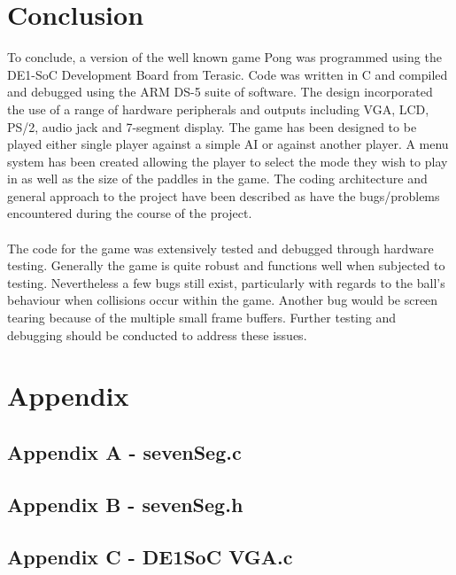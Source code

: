 \documentclass[a4paper,12pt]{article}
\begin{document}
\section{Conclusion}
\begin{flushleft}
To conclude, a version of the well known game Pong was programmed using the DE1-SoC Development Board from Terasic. Code was written in C and compiled and debugged using the ARM DS-5 suite of software. The design incorporated the use of a range of hardware peripherals and outputs including VGA, LCD, PS/2, audio jack and 7-segment display. The game has been designed to be played either single player against a simple AI or against another player. A menu system has been created allowing the player to select the mode they wish to play in as well as the size of the paddles in the game. The coding architecture and general approach to the project have been described as have the bugs/problems encountered during the course of the project. 
\\ \- \\
The code for the game was extensively tested and debugged through hardware testing. Generally the game is quite robust and functions well when subjected to testing. Nevertheless a few bugs still exist, particularly with regards to the ball’s behaviour when collisions occur within the game. Another bug would be screen tearing because of the multiple small frame buffers. Further testing and debugging should be conducted to address these issues. 
\end{flushleft}
\newpage
\section{Appendix \label{section:appendix}}
\subsection{Appendix A - sevenSeg.c}

\newpage
\subsection{Appendix B - sevenSeg.h}

\newpage
\subsection{Appendix C - DE1SoC VGA.c}

\newpage
\end{document}
